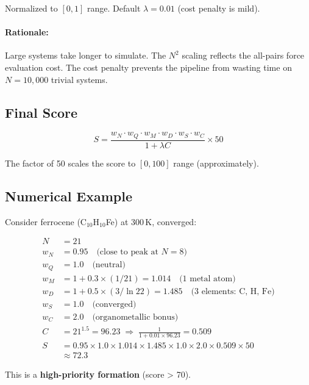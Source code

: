 \documentclass[11pt]{article}
\begin{document}
Normalized to $[0, 1]$ range. Default $\lambda = 0.01$ (cost penalty is mild).

\paragraph{Rationale:} Large systems take longer to simulate. The $N^2$ scaling reflects the all-pairs force evaluation cost. The cost penalty prevents the pipeline from wasting time on $N = 10{,}000$ trivial systems.

\subsection{Final Score}

\begin{equation}
S = \frac{w_N \cdot w_Q \cdot w_M \cdot w_D \cdot w_S \cdot w_C}{1 + \lambda C} \times 50
\end{equation}

The factor of 50 scales the score to $[0, 100]$ range (approximately).

\subsection{Numerical Example}

Consider ferrocene (C$_{10}$H$_{10}$Fe) at 300\,K, converged:

\begin{align}
N &= 21 \\
w_N &= 0.95 \quad \text{(close to peak at } N = 8\text{)} \\
w_Q &= 1.0 \quad \text{(neutral)} \\
w_M &= 1 + 0.3 \times (1/21) = 1.014 \quad \text{(1 metal atom)} \\
w_D &= 1 + 0.5 \times (3 / \ln 22) = 1.485 \quad \text{(3 elements: C, H, Fe)} \\
w_S &= 1.0 \quad \text{(converged)} \\
w_C &= 2.0 \quad \text{(organometallic bonus)} \\
C &= 21^{1.5} = 96.23 \; \Rightarrow \; \frac{1}{1 + 0.01 \times 96.23} = 0.509 \\
S &= 0.95 \times 1.0 \times 1.014 \times 1.485 \times 1.0 \times 2.0 \times 0.509 \times 50 \\
&\approx 72.3
\end{align}

This is a \textbf{high-priority formation} (score > 70).
\end{document}
